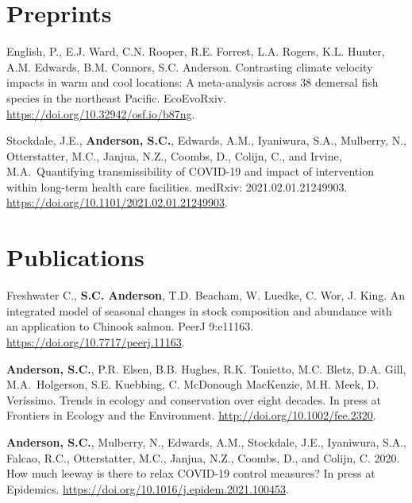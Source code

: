 \hypertarget{preprints}{%
\section{Preprints}\label{preprints}}

\begin{description}
\tightlist
\item[2021]
English, P., E.J. Ward, C.N. Rooper, R.E. Forrest, L.A. Rogers, K.L.
Hunter, A.M. Edwards, B.M. Connors, S.C. Anderson. Contrasting climate
velocity impacts in warm and cool locations: A meta-analysis across 38
demersal fish species in the northeast Pacific. EcoEvoRxiv.
\url{https://doi.org/10.32942/osf.io/b87ng}.
\item[2021]
Stockdale, J.E., \textbf{Anderson, S.C.}, Edwards, A.M., Iyaniwura,
S.A., Mulberry, N., Otterstatter, M.C., Janjua, N.Z., Coombs, D.,
Colijn, C., and Irvine, M.A.\ Quantifying transmissibility of COVID-19
and impact of intervention within long-term health care facilities.
medRxiv: 2021.02.01.21249903.
\url{https://doi.org/10.1101/2021.02.01.21249903}.
\end{description}

\hypertarget{publications}{%
\section{Publications}\label{publications}}

\begin{description}
\tightlist
\item[2021]
Freshwater C., \textbf{S.C. Anderson}, T.D. Beacham, W. Luedke, C. Wor,
J. King. An integrated model of seasonal changes in stock composition
and abundance with an application to Chinook salmon. PeerJ 9:e11163.
\url{https://doi.org/10.7717/peerj.11163}.
\item[2021]
\textbf{Anderson, S.C.}, P.R. Elsen, B.B. Hughes, R.K. Tonietto, M.C.
Bletz, D.A. Gill, M.A.\ Holgerson, S.E. Kuebbing, C. McDonough MacKenzie,
M.H. Meek, D. Veríssimo. Trends in ecology and conservation over eight
decades. In press at Frontiers in Ecology and the Environment.
\url{http://doi.org/10.1002/fee.2320}.
\item[2021]
\textbf{Anderson, S.C.}, Mulberry, N., Edwards, A.M., Stockdale, J.E.,
Iyaniwura, S.A., Falcao, R.C., Otterstatter, M.C., Janjua, N.Z., Coombs,
D., and Colijn, C. 2020. How much leeway is there to relax COVID-19
control measures? In press at Epidemics.
\url{https://doi.org/10.1016/j.epidem.2021.100453}.
\end{description}

